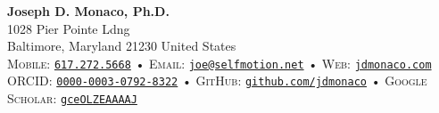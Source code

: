 \begin{center}
  \textbf{\LARGE\color{hopkinsblue} Joseph D. Monaco, Ph.D.} \\[0.1in]
  1028 Pier Pointe Ldng \\
  Baltimore, Maryland 21230 United States \\[2mm]
  \small
  \textsc{Mobile:} \href{tel:16172725668}{\color{hopkinsblue}\texttt{617.272.5668}} •
  \textsc{Email:} \href{mailto:joe@selfmotion.net}{\color{hopkinsblue}\texttt{joe@selfmotion.net}} • 
  \textsc{Web:} \href{https://jdmonaco.com/}{\color{hopkinsblue}\texttt{jdmonaco.com}} \\  
  \textsc{ORCID:} \href{https://jdmonaco.com/orcid}{\color{hopkinsblue}\texttt{0000-0003-0792-8322}} • 
  \textsc{GitHub:} \href{https://jdmonaco.com/github}{\color{hopkinsblue}\texttt{github.com/jdmonaco}} • 
  \textsc{Google Scholar:} \href{https://jdmonaco.com/google-scholar}{\color{hopkinsblue}\texttt{gceOLZEAAAAJ}} 
\end{center}



